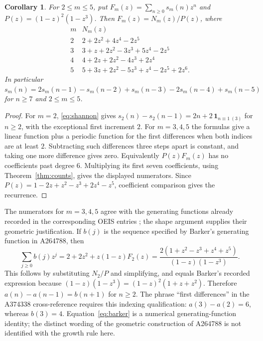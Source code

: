 \documentclass[11pt]{article}
\newtheorem{corollary}[theorem]{Corollary}
\begin{document}
\begin{corollary}\label{cor:gf}
For $2\leq m\leq5$, put $F_m(z)=\sum_{n\geq0}s_m(n)z^n$ and
$P(z)=(1-z)^2(1-z^3)$. Then $F_m(z)=N_m(z)/P(z)$, where
\[
\begin{array}{c|l}
m&N_m(z)\\\hline
2&2+2z^2+4z^4-2z^5\\
3&3+z+2z^2-3z^3+5z^4-2z^5\\
4&4+2z+2z^2-4z^3+2z^4\\
5&5+3z+2z^2-5z^3+z^4-2z^5+2z^6.
\end{array}
\]
In particular $s_m(n)=2s_m(n-1)-s_m(n-2)+s_m(n-3)
-2s_m(n-4)+s_m(n-5)$ for $n\geq7$ and $2\leq m\leq5$.
\end{corollary}
\begin{proof}
For $m=2$, \eqref{eq:shannon} gives
$s_2(n)-s_2(n-1)=2n+2\,\mathbf1_{n\equiv1\ (3)}$ for $n\geq2$,
with the exceptional first increment $2$.
For $m=3,4,5$ the formulas give a linear function plus a periodic
function for the first differences when both indices are at least $2$.
Subtracting such differences three steps apart is constant, and taking
one more difference gives zero. Equivalently $P(z)F_m(z)$ has no
coefficients past degree $6$. Multiplying its first seven coefficients,
using Theorem~\ref{thm:counts}, gives the displayed numerators.
Since $P(z)=1-2z+z^2-z^3+2z^4-z^5$, coefficient comparison gives the recurrence.
\end{proof}

The numerators for $m=3,4,5$ agree with the generating functions already
recorded in the corresponding OEIS entries \cite{three,four,five}; the
shape argument supplies their geometric justification. If $b(j)$ is the
sequence specified by Barker's generating function in A264788, then
\begin{equation}\label{eq:barker}
 \sum_{j\geq0}b(j)z^j=2+2z^2+z(1-z)F_2(z)
 =\frac{2(1+z^2-z^3+z^4+z^5)}{(1-z)(1-z^3)}.
\end{equation}
This follows by substituting $N_2/P$ and simplifying, and equals Barker's
recorded expression because $(1-z)(1-z^3)=(1-z)^2(1+z+z^2)$.
Therefore $a(n)-a(n-1)=b(n+1)$ for $n\geq2$.
The phrase ``first differences'' in the A374338 cross-reference requires
this indexing qualification: $a(3)-a(2)=6$, whereas $b(3)=4$.
Equation~\eqref{eq:barker} is a numerical generating-function identity;
the distinct wording of the geometric construction of A264788 is not
identified with the growth rule here.
\end{document}
